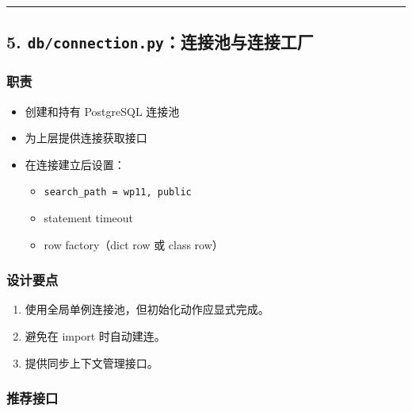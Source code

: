 \documentclass[UTF8]{ctexart}
\providecommand{\tightlist}{%
  \setlength{\itemsep}{0pt}\setlength{\parskip}{0pt}}
\begin{document}
\begin{center}\rule{0.5\linewidth}{0.5pt}\end{center}

\hypertarget{dbconnection.pyux8fdeux63a5ux6c60ux4e0eux8fdeux63a5ux5de5ux5382}{%
\subsection{\texorpdfstring{5.
\texttt{db/connection.py}：连接池与连接工厂}{5. db/connection.py：连接池与连接工厂}}\label{dbconnection.pyux8fdeux63a5ux6c60ux4e0eux8fdeux63a5ux5de5ux5382}}

\hypertarget{ux804cux8d23}{%
\subsubsection{职责}\label{ux804cux8d23}}

\begin{itemize}
\tightlist
\item
  创建和持有 PostgreSQL 连接池
\item
  为上层提供连接获取接口
\item
  在连接建立后设置：

  \begin{itemize}
  \tightlist
  \item
    \texttt{search\_path\ =\ wp11,\ public}
  \item
    statement timeout
  \item
    row factory（dict row 或 class row）
  \end{itemize}
\end{itemize}

\hypertarget{ux8bbeux8ba1ux8981ux70b9}{%
\subsubsection{设计要点}\label{ux8bbeux8ba1ux8981ux70b9}}

\begin{enumerate}
\def\labelenumi{\arabic{enumi}.}
\tightlist
\item
  使用全局单例连接池，但初始化动作应显式完成。
\item
  避免在 import 时自动建连。
\item
  提供同步上下文管理接口。
\end{enumerate}

\hypertarget{ux63a8ux8350ux63a5ux53e3}{%
\subsubsection{推荐接口}\label{ux63a8ux8350ux63a5ux53e3}}
\end{document}
